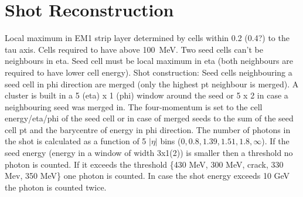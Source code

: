\section{Shot Reconstruction}
\label{sec:shot_reco}


Local maximum in EM1 strip layer determined by cells within 0.2 (0.4?) to the
tau axis. Cells required to have above \SI{100}{\mega\electronvolt}. Two seed
cells can't be neighbours in eta. Seed cell must be local maximum in eta (both
neighbours are required to have lower cell energy). Shot construction: Seed
cells neighbouring a seed cell in phi direction are merged (only the highest pt
neighbour is merged). A cluster is built in a 5 (eta) x 1 (phi) window around
the seed or 5 x 2 in case a neighbouring seed was merged in. The four-momentum
is set to the cell energy/eta/phi of the seed cell or in case of merged seeds to
the sum of the seed cell pt and the barycentre of energy in phi direction. The
number of photons in the shot is calculated as a function of 5 $|\eta|$ bins
($0, 0.8, 1.39, 1.51, 1.8, \infty$). If the seed energy (energy in a window of
width 3x1(2)) is smaller then a threshold no photon is counted. If it exceeds
the threshold \{430 MeV, 300 MeV, crack, 330 Mev, 350 MeV\} one photon is
counted. In case the shot energy exceeds 10 GeV the photon is counted twice.


\cite{atlas:taurec:run1}
\cite{atlas:taurec:run2}
\cite{atlas:taurec:decaymodes}

